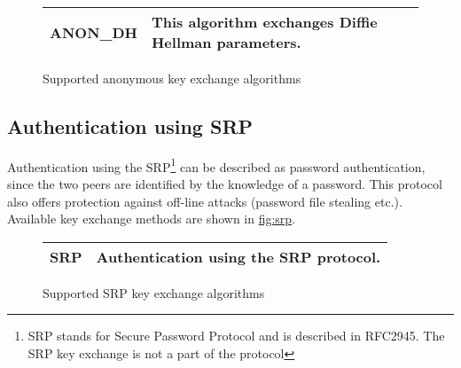 \begin{figure}[hbtp]
\begin{tabular}{|l|p{9cm}|}

\hline
ANON\_DH & This algorithm exchanges Diffie Hellman parameters. 
\\
\hline
\end{tabular}

\caption{Supported anonymous key exchange algorithms}
\label{fig:anon}

\end{figure}

\subsection{Authentication using SRP}
Authentication using the SRP\footnote{SRP stands for Secure Password Protocol and 
is described in RFC2945. The SRP key exchange is not a part of the \tlsI protocol}
can be described as password authentication, since the two peers are identified by the knowledge 
of a password. This protocol also offers protection against off-line attacks (password file stealing
etc.). 
Available key exchange methods are shown in \hyperref{figure}{figure }{}{fig:srp}.

\begin{figure}[hbtp]
\begin{tabular}{|l|p{9cm}|}

\hline
SRP & Authentication using the SRP protocol. 
\\
\hline
\end{tabular}

\caption{Supported SRP key exchange algorithms}
\label{fig:srp}

\end{figure}
